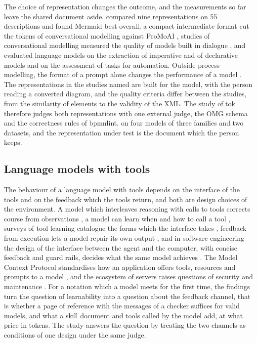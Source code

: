 \documentclass[11pt,a4paper]{article}
\begin{document}
The choice of representation changes the outcome, and the measurements so far leave the shared document aside. \citet{Brissard2026representation} compared nine representations on 55 descriptions and found Mermaid best overall, a compact intermediate format cut the tokens of conversational modelling against ProMoAI \citep{Kopke2025efficient}, studies of conversational modelling measured the quality of models built in dialogue \citep{Klievtsova2023}, and \citet{Grohs2024} evaluated language models on the extraction of imperative and of declarative models and on the assessment of tasks for automation. Outside process modelling, the format of a prompt alone changes the performance of a model \citep{He2024formatting}. The representations in the studies named are built for the model, with the person reading a converted diagram, and the quality criteria differ between the studies, from the similarity of elements to the validity of the XML. The study of tok therefore judges both representations with one external judge, the OMG schema and the correctness rules of bpmnlint, on four models of three families and two datasets, and the representation under test is the document which the person keeps.

\subsection{Language models with tools}

The behaviour of a language model with tools depends on the interface of the tools and on the feedback which the tools return, and both are design choices of the environment. A model which interleaves reasoning with calls to tools corrects course from observations \citep{Yao2022ReAct}, a model can learn when and how to call a tool \citep{Schick2023}, surveys of tool learning catalogue the forms which the interface takes \citep{Qin2025tool}, feedback from execution lets a model repair its own output \citep{Chen2024selfdebug}, and in software engineering the design of the interface between the agent and the computer, with concise feedback and guard rails, decides what the same model achieves \citep{Yang2024sweagent}. The Model Context Protocol standardises how an application offers tools, resources and prompts to a model \citep{MCP2025}, and the ecosystem of servers raises questions of security and maintenance \citep{Hou2025mcp}. For a notation which a model meets for the first time, the findings turn the question of learnability into a question about the feedback channel, that is whether a page of reference with the messages of a checker suffices for valid models, and what a skill document and tools called by the model add, at what price in tokens. The study answers the question by treating the two channels as conditions of one design under the same judge.
\end{document}
